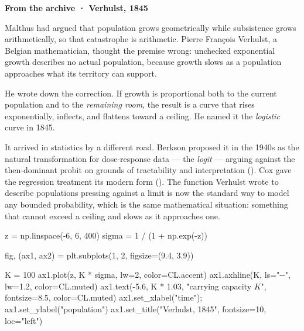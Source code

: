 \documentclass[
  letterpaper,
  10pt,
  twoside,
  openright,
  numbers=noenddot,
  chapterprefix=true]{scrbook}
\newenvironment{Shaded}{}{}
\newcommand{\DecValTok}[1]{\textcolor[rgb]{0.00,0.36,0.77}{#1}}
\newcommand{\FloatTok}[1]{\textcolor[rgb]{0.00,0.36,0.77}{#1}}
\newcommand{\NormalTok}[1]{\textcolor[rgb]{0.14,0.16,0.18}{#1}}
\newcommand{\OperatorTok}[1]{\textcolor[rgb]{0.14,0.16,0.18}{#1}}
\newcommand{\StringTok}[1]{\textcolor[rgb]{0.01,0.18,0.38}{#1}}
\newenvironment{qmibarchive}
  {\par\medskip\noindent{\color{econgold}\rule{\linewidth}{1.4pt}}%
   \par\nobreak\vspace{4pt}\noindent\ignorespaces}
  {\par\vspace{2pt}\noindent{\color{econrule}\rule{\linewidth}{0.4pt}}\par\medskip}
\begin{document}
\begin{qmibarchive}

\textbf{From the archive · Verhulst, 1845}

Malthus had argued that population grows geometrically while subsistence
grows arithmetically, so that catastrophe is arithmetic. Pierre François
Verhulst, a Belgian mathematician, thought the premise wrong: unchecked
exponential growth describes no actual population, because growth slows
as a population approaches what its territory can support.

He wrote down the correction. If growth is proportional both to the
current population and to the \emph{remaining room}, the result is a
curve that rises exponentially, inflects, and flattens toward a ceiling.
He named it the \emph{logistic} curve in 1845.

It arrived in statistics by a different road. Berkson proposed it in the
1940s as the natural transformation for dose-response data --- the
\emph{logit} --- arguing against the then-dominant probit on grounds of
tractability and interpretation (). Cox gave the regression treatment its modern form
(). The function Verhulst wrote to
describe populations pressing against a limit is now the standard way to
model any bounded probability, which is the same mathematical situation:
something that cannot exceed a ceiling and slows as it approaches one.

\begin{Shaded}
\begin{Highlighting}[]
\NormalTok{z }\OperatorTok{=}\NormalTok{ np.linspace(}\OperatorTok{{-}}\DecValTok{6}\NormalTok{, }\DecValTok{6}\NormalTok{, }\DecValTok{400}\NormalTok{)}
\NormalTok{sigma }\OperatorTok{=} \DecValTok{1} \OperatorTok{/}\NormalTok{ (}\DecValTok{1} \OperatorTok{+}\NormalTok{ np.exp(}\OperatorTok{{-}}\NormalTok{z))}

\NormalTok{fig, (ax1, ax2) }\OperatorTok{=}\NormalTok{ plt.subplots(}\DecValTok{1}\NormalTok{, }\DecValTok{2}\NormalTok{, figsize}\OperatorTok{=}\NormalTok{(}\FloatTok{9.4}\NormalTok{, }\FloatTok{3.9}\NormalTok{))}

\NormalTok{K }\OperatorTok{=} \DecValTok{100}
\NormalTok{ax1.plot(z, K }\OperatorTok{*}\NormalTok{ sigma, lw}\OperatorTok{=}\DecValTok{2}\NormalTok{, color}\OperatorTok{=}\NormalTok{CL.accent)}
\NormalTok{ax1.axhline(K, ls}\OperatorTok{=}\StringTok{"{-}{-}"}\NormalTok{, lw}\OperatorTok{=}\FloatTok{1.2}\NormalTok{, color}\OperatorTok{=}\NormalTok{CL.muted)}
\NormalTok{ax1.text(}\OperatorTok{{-}}\FloatTok{5.6}\NormalTok{, K }\OperatorTok{*} \FloatTok{1.03}\NormalTok{, }\StringTok{"carrying capacity $K$"}\NormalTok{, fontsize}\OperatorTok{=}\FloatTok{8.5}\NormalTok{, color}\OperatorTok{=}\NormalTok{CL.muted)}
\NormalTok{ax1.set\_xlabel(}\StringTok{"time"}\NormalTok{)}\OperatorTok{;}\NormalTok{ ax1.set\_ylabel(}\StringTok{"population"}\NormalTok{)}
\NormalTok{ax1.set\_title(}\StringTok{"Verhulst, 1845"}\NormalTok{, fontsize}\OperatorTok{=}\DecValTok{10}\NormalTok{, loc}\OperatorTok{=}\StringTok{"left"}\NormalTok{)}


\end{Highlighting}
\end{Shaded}
\end{qmibarchive}
\end{document}
